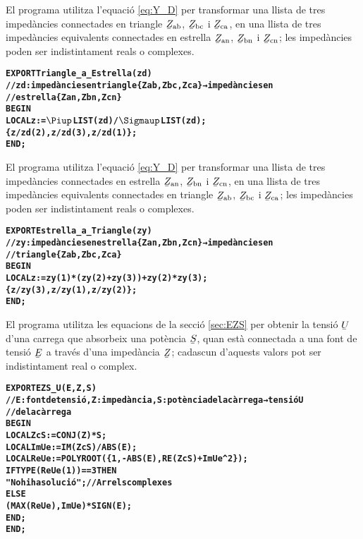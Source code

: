 El programa  utilitza l'equació \eqref{eq:Y_D} per transformar una llista de tres impedàncies connectades en triangle $\cmplx{Z}\ped{ab}$, $\cmplx{Z}\ped{bc}$ i  $\cmplx{Z}\ped{ca}$, en una llista de tres impedàncies equivalents connectades en estrella $\cmplx{Z}\ped{an}$, $\cmplx{Z}\ped{bn}$ i $\cmplx{Z}\ped{cn}$; les impedàncies poden ser indistintament reals o complexes.
\vspace{-6mm}
\begin{alltt}
\bfseries
{}
    EXPORT Triangle_a_Estrella(zd)
    // zd:impedàncies en triangle \{Zab,Zbc,Zca\} → impedàncies en
    // estrella \{Zan,Zbn,Zcn\}
    BEGIN
      LOCAL z:=\(\Piup\)LIST(zd)/\(\Sigmaup\)LIST(zd);
      \{z/zd(2),z/zd(3),z/zd(1)\};
    END;
\end{alltt}

El programa  utilitza l'equació \eqref{eq:Y_D} per transformar una llista de tres impedàncies connectades en estrella $\cmplx{Z}\ped{an}$, $\cmplx{Z}\ped{bn}$ i $\cmplx{Z}\ped{cn}$, en una llista de tres impedàncies equivalents connectades en triangle $\cmplx{Z}\ped{ab}$, $\cmplx{Z}\ped{bc}$ i  $\cmplx{Z}\ped{ca}$; les impedàncies poden ser indistintament reals o complexes.
\vspace{-6mm}
\begin{alltt}
\bfseries
{}
    EXPORT Estrella_a_Triangle(zy)
    // zy:impedàncies en estrella \{Zan,Zbn,Zcn\} → impedàncies en
    // triangle \{Zab,Zbc,Zca\}
    BEGIN
      LOCAL z:=zy(1)*(zy(2)+zy(3))+zy(2)*zy(3);
      \{z/zy(3),z/zy(1),z/zy(2)\};
    END;
\end{alltt}

El programa  utilitza les equacions de la secció \vref{sec:EZS} per obtenir la tensió $\cmplx{U}$ d'una carrega que absorbeix una potència $\cmplx{S}$, quan està connectada a una font de tensió $\cmplx{E}$ a través d'una impedància $\cmplx{Z}$; cadascun d'aquests valors pot ser indistintament real o complex.
\vspace{-6mm}
\begin{alltt}
\bfseries
{}
    EXPORT EZS_U(E,Z,S)
    // E:font de tensió, Z:impedància, S:potència de la càrrega → tensió U
    // de la càrrega
    BEGIN
      LOCAL ZcS:=CONJ(Z)*S;
      LOCAL ImUe:=IM(ZcS)/ABS(E);
      LOCAL ReUe:=POLYROOT(\{1,-ABS(E),RE(ZcS)+ImUe^2\});
      IF TYPE(ReUe(1))==3 THEN
        "No hi ha solució"; // Arrels complexes
      ELSE
        (MAX(ReUe),ImUe)*SIGN(E);
      END;
    END;
\end{alltt}


